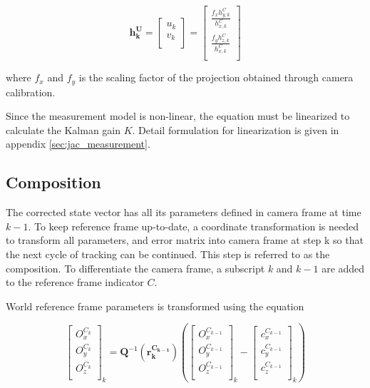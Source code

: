 \begin{equation}
\mathbf{h_{k}^{U}}= \begin{bmatrix}
u_{k} \\
v_{k} \\
\end{bmatrix}=\begin{bmatrix}
\frac{f_{x}h_{y,k}^{C}}{h_{x,k}^{C}} \\
\frac{f_{y}h_{z,k}^{C}}{h_{x,k}^{C}} \\
\end{bmatrix}
\end{equation}

\noindent where $f_{x}$ and $f_{y}$ is the scaling factor of the projection 
obtained through camera calibration.

Since the measurement model is non-linear, the equation must be
linearized to calculate the Kalman gain $K$. Detail formulation for
linearization is given in appendix \ref{sec:jac_measurement}.

\subsection{Composition}

The corrected state vector has all its parameters defined in camera
frame at time $k-1$. To keep reference frame up-to-date, a coordinate
transformation is needed to transform all parameters, and error matrix
into camera frame at step k so that the next cycle of tracking can be
continued. This step is referred to as the composition. To
differentiate the camera frame, a subscript $k$ and $k-1$ are added to
the reference frame indicator $C$.

World reference frame parameters is transformed using the equation

\begin{equation}
\begin{bmatrix}
O_{x}^{C_{k}} \\
O_{y}^{C_k} \\
O_{z}^{C_k} \\
\end{bmatrix}_{k}=\mathbf{Q}^{-1}(\mathbf{r_{k}^{C_{k-1}}})\left(
\begin{bmatrix}
O_{x}^{C_{k-1}} \\
O_{y}^{C_{k-1}} \\
O_{z}^{C_{k-1}} \\
\end{bmatrix}_{k}- \begin{bmatrix}
c_{x}^{C_{k-1}} \\
c_{y}^{C_{k-1}} \\
c_{z}^{C_{k-1}} \\
\end{bmatrix}_{k}\right)
\end{equation}

